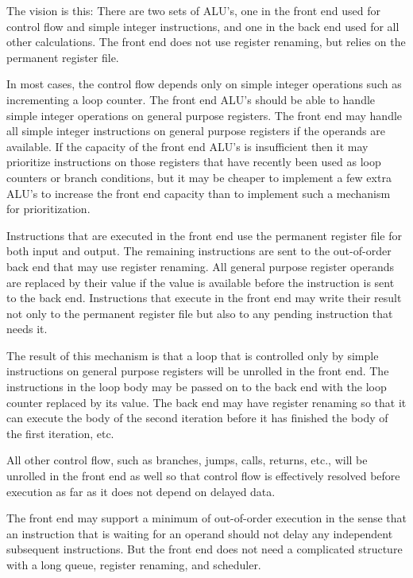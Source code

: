 \documentclass[forwardcom.tex]{subfiles}
\begin{document}
The vision is this: There are two sets of ALU's, one in the front end used for control flow and simple integer instructions, and one in the back end used for all other calculations. The front end does not use register renaming, but relies on the permanent register file.
\vv

In most cases, the control flow depends only on simple integer operations such as incrementing a loop counter. The front end ALU's should be able to handle simple integer operations on general purpose registers. The front end may handle all simple integer instructions on general purpose registers if the operands are available. If the capacity of the front end ALU's is insufficient then it may prioritize instructions on those registers that have recently been used as loop counters or branch conditions, but it may be cheaper to implement a few extra ALU's to increase the front end capacity than to implement such a mechanism for prioritization.
\vv

Instructions that are executed in the front end use the permanent register file for both input and output.  
The remaining instructions are sent to the out-of-order back end that may use register renaming. 
All general purpose register operands are replaced by their value if the value is available before the instruction is sent to the back end.
Instructions that execute in the front end may write their result not only to the permanent register file but also to any pending instruction that needs it.
\vv

The result of this mechanism is that a loop that is controlled only by simple instructions on general purpose registers
will be unrolled in the front end. The instructions in the loop body may be passed on to the back end with the loop counter replaced by its value. The back end may have register renaming so that it can execute the body of the second iteration before it has finished the body of the first iteration, etc.
\vv

All other control flow, such as branches, jumps, calls, returns, etc., will be unrolled in the front end as well so that control flow is effectively resolved before execution as far as it does not depend on delayed data.
\vv

The front end may support a minimum of out-of-order execution in the sense that an instruction that is waiting for an operand should not delay any independent subsequent instructions. But the front end does not need a complicated structure with a long queue, register renaming, and scheduler.
\vv
\end{document}
